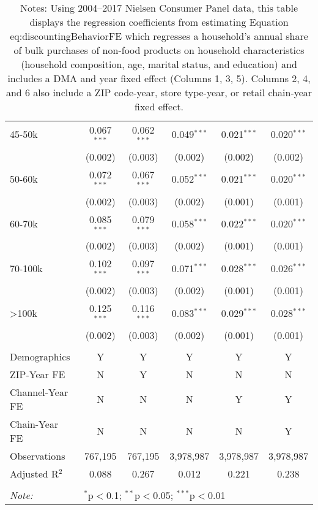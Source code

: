 \begin{table}[!htbp]
\begin{tabular}{@{\extracolsep{5pt}}lccccc}
  45-50k & 0.067$^{***}$ & 0.062$^{***}$ & 0.049$^{***}$ & 0.021$^{***}$ & 0.020$^{***}$ \\
  & (0.002) & (0.003) & (0.002) & (0.002) & (0.002) \\
  50-60k & 0.072$^{***}$ & 0.067$^{***}$ & 0.052$^{***}$ & 0.021$^{***}$ & 0.020$^{***}$ \\
  & (0.002) & (0.003) & (0.002) & (0.001) & (0.001) \\
  60-70k & 0.085$^{***}$ & 0.079$^{***}$ & 0.058$^{***}$ & 0.022$^{***}$ & 0.020$^{***}$ \\
  & (0.002) & (0.003) & (0.002) & (0.001) & (0.001) \\
  70-100k & 0.102$^{***}$ & 0.097$^{***}$ & 0.071$^{***}$ & 0.028$^{***}$ & 0.026$^{***}$ \\
  & (0.002) & (0.003) & (0.002) & (0.001) & (0.001) \\
  >100k & 0.125$^{***}$ & 0.116$^{***}$ & 0.083$^{***}$ & 0.029$^{***}$ & 0.028$^{***}$ \\
  & (0.002) & (0.003) & (0.002) & (0.001) & (0.001) \\
 \hline \\[-1.8ex]
Demographics & Y & Y & Y & Y & Y \\
ZIP-Year FE & N & Y & N & N & N \\
Channel-Year FE & N & N & N & Y & Y \\
Chain-Year FE & N & N & N & N & Y \\
Observations & 767,195 & 767,195 & 3,978,987 & 3,978,987 & 3,978,987 \\
Adjusted R$^{2}$ & 0.088 & 0.267 & 0.012 & 0.221 & 0.238 \\
\hline
\hline \\[-1.8ex]
\textit{Note:}  & \multicolumn{5}{l}{$^{*}$p$<$0.1; $^{**}$p$<$0.05; $^{***}$p$<$0.01} \\
\end{tabular}
\caption*{Notes: Using 2004--2017 Nielsen Consumer Panel data, this table displays the regression coefficients from estimating Equation {eq:discountingBehaviorFE} which regresses a household's annual share of bulk purchases of non-food products on household characteristics (household composition, age, marital status, and education) and includes a DMA and year fixed effect (Columns 1, 3, 5). Columns 2, 4, and 6 also include a ZIP code-year, store type-year, or retail chain-year fixed effect.}
\end{table}

